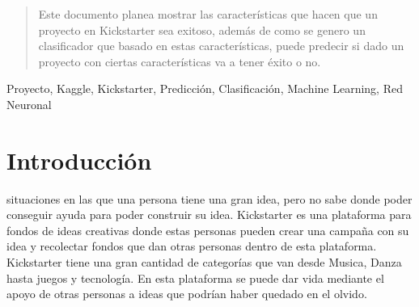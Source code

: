 \documentclass[journal]{IEEEtran}
\begin{document}




\maketitle

\begin{abstract}
Este documento planea mostrar las características que hacen que un proyecto en Kickstarter sea exitoso, además de como se genero un clasificador que basado en estas características, puede predecir si dado un proyecto con ciertas características va a tener éxito o no.
\end{abstract}

\begin{IEEEkeywords}
Proyecto, Kaggle, Kickstarter, Predicción, Clasificación, Machine Learning, Red Neuronal
\end{IEEEkeywords}






%
\IEEEpeerreviewmaketitle



\section{Introducción}
% 
% 
% 
% 
 situaciones en las que una persona tiene una gran idea, pero no sabe donde poder conseguir ayuda para poder construir su idea. Kickstarter es una plataforma para fondos de ideas creativas donde estas personas pueden crear una campaña con su idea y recolectar fondos que dan otras personas dentro de esta plataforma. Kickstarter tiene una gran cantidad de categorías que van desde Musica, Danza hasta juegos y tecnología. En esta plataforma se puede dar vida mediante el apoyo de otras personas a ideas que podrían haber quedado en el olvido.
\end{document}
